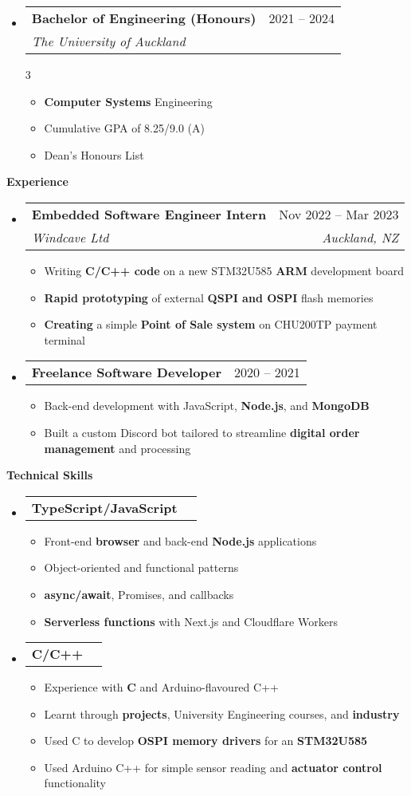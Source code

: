 \documentclass[11pt,a4paper]{article}[leftmargin=*]
\makeatletter
\def \entryspacing {-0pt}
\def \bulletstylei {\faAngleRight\hspace{-4.5pt}}
\renewcommand{\section}[2]{\vspace{5pt}
  \colorbox{secondary}{\color{white}\raggedbottom\normalsize\textbf{{#1}{\hspace{2pt}#2\hspace{4pt}}}}
}
\newcommand{\resumeEntryStart}{\begin{itemize}[leftmargin=2.5mm]}
\newcommand{\resumeEntryEnd}{\end{itemize}\vspace{\entryspacing}}
\newcommand{\resumeItemListStart}{\begin{itemize}[leftmargin=4.5mm]}
\newcommand{\resumeItemListEnd}{\end{itemize}}
\newcommand{\resumeItemListStartColumns}[2][-0.5]{\vspace*{#1\multicolsep}
\begin{multicols}{#2}\begin{itemize}[leftmargin=4.5mm]}
\newcommand{\resumeItemListEndColumns}[1][-1]{\end{itemize}\end{multicols}\vspace*{#1\multicolsep}}
\newcommand{\resumeItem}[2][\bulletstylei]{
  \item[\small#1]\small{
    {#2 \vspace{-2pt}}
  }
}
\newcommand{\resumeEntryTSDL}[4]{
  \vspace{-1pt}\item[]
    \begin{tabularx}{0.97\textwidth}{X@{\hspace{60pt}}r}
      \textbf{\color{primary}#1} & {\firabook\color{accent}\small#2} \\
      \textit{\color{accent}\small#3} & \textit{\color{accent}\small#4} \\
    \end{tabularx}\vspace{-6pt}
}
\newcommand{\resumeEntryTD}[2]{
  \vspace{-1pt}\item[]
    \begin{tabularx}{0.97\textwidth}{X@{\hspace{60pt}}r}
      \textbf{\color{primary}#1} & {\firabook\color{accent}\small#2} \\
    \end{tabularx}\vspace{-6pt}
}
\newcommand{\resumeBf}[1]{\small\textbf{\color{halfbold}#1}}
\makeatother
\begin{document}
\resumeEntryStart
\resumeEntryTSDL
{Bachelor of Engineering (Honours)}{2021 -- 2024}
{The University of Auckland}{}
\resumeItemListStartColumns[0.5]{3}
\resumeItem {\resumeBf{Computer Systems} Engineering}
\resumeItem {Cumulative GPA of 8.25/9.0 (A)}
\resumeItem {Dean's Honours List}
\resumeItemListEndColumns
\resumeEntryEnd


\section{\faBriefcase}{Experience}

\resumeEntryStart
\resumeEntryTSDL
{Embedded Software Engineer Intern}{Nov 2022 -- Mar 2023}
{Windcave Ltd}{Auckland, NZ}

\resumeItemListStart
\resumeItem {Writing \resumeBf{C/C++ code} on a new STM32U585 \resumeBf{ARM} development board}
\resumeItem {\resumeBf{Rapid prototyping} of external \resumeBf{QSPI and OSPI} flash memories}
\resumeItem {\resumeBf{Creating} a simple \resumeBf{Point of Sale system} on CHU200TP payment terminal}
\resumeItemListEnd
\resumeEntryEnd

\resumeEntryStart
\resumeEntryTD
{Freelance Software Developer}{2020 -- 2021}
\resumeItemListStart
\resumeItem {Back-end development with JavaScript, \resumeBf{Node.js}, and \resumeBf{MongoDB}}
\resumeItem {Built a custom Discord bot tailored to streamline \resumeBf{digital order management} and processing}
\resumeItemListEnd
\resumeEntryEnd


\section{\faCogs}{Technical Skills}

\resumeEntryStart
\resumeEntryTD
{TypeScript/JavaScript}{}
\resumeItemListStart
\resumeItem {Front-end \resumeBf{browser} and back-end \resumeBf{Node.js} applications}
\resumeItem {Object-oriented and functional patterns}
\resumeItem {\resumeBf{async/await}, Promises, and callbacks}
\resumeItem {\resumeBf{Serverless functions} with Next.js and Cloudflare Workers}
\resumeItemListEnd
\resumeEntryEnd

\resumeEntryStart
\resumeEntryTD
{C/C++}{}
\resumeItemListStart
\resumeItem {Experience with \resumeBf{C} and Arduino-flavoured C++}
\resumeItem {Learnt through \resumeBf{projects}, University Engineering courses, and \resumeBf{industry}}
\resumeItem {Used C to develop \resumeBf{OSPI memory drivers} for an \resumeBf{STM32U585}}
\resumeItem {Used Arduino C++ for simple sensor reading and \resumeBf{actuator control} functionality}
\resumeItemListEnd
\resumeEntryEnd
\end{document}

